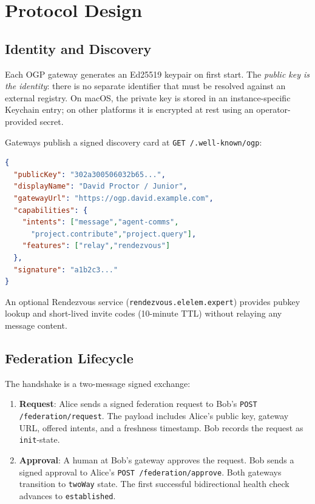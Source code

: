\documentclass[sigconf,nonacm]{acmart}
\begin{document}
\section{Protocol Design}

\subsection{Identity and Discovery}

Each OGP gateway generates an Ed25519 keypair on first start.
The \emph{public key is the identity}: there is no separate identifier
that must be resolved against an external registry.
On macOS, the private key is stored in an instance-specific Keychain entry;
on other platforms it is encrypted at rest using an operator-provided secret.

Gateways publish a signed discovery card at \texttt{GET /.well-known/ogp}:

\begin{lstlisting}[language=json, caption={Discovery card (abbreviated).}]
{
  "publicKey": "302a300506032b65...",
  "displayName": "David Proctor / Junior",
  "gatewayUrl": "https://ogp.david.example.com",
  "capabilities": {
    "intents": ["message","agent-comms",
      "project.contribute","project.query"],
    "features": ["relay","rendezvous"]
  },
  "signature": "a1b2c3..."
}
\end{lstlisting}

An optional Rendezvous service (\texttt{rendezvous.elelem.expert})
provides pubkey lookup and short-lived invite codes (10-minute TTL)
without relaying any message content.

\subsection{Federation Lifecycle}

The handshake is a two-message signed exchange:

\begin{enumerate}
\item \textbf{Request}: Alice sends a signed federation request to Bob's
  \texttt{POST /federation/request}. The payload includes Alice's public key,
  gateway URL, offered intents, and a freshness timestamp. Bob records the
  request as \texttt{init}-state.
\item \textbf{Approval}: A human at Bob's gateway approves the request.
  Bob sends a signed approval to Alice's \texttt{POST /federation/approve}.
  Both gateways transition to \texttt{twoWay} state.
  The first successful bidirectional health check advances to
  \texttt{established}.
\end{enumerate}
\end{document}
